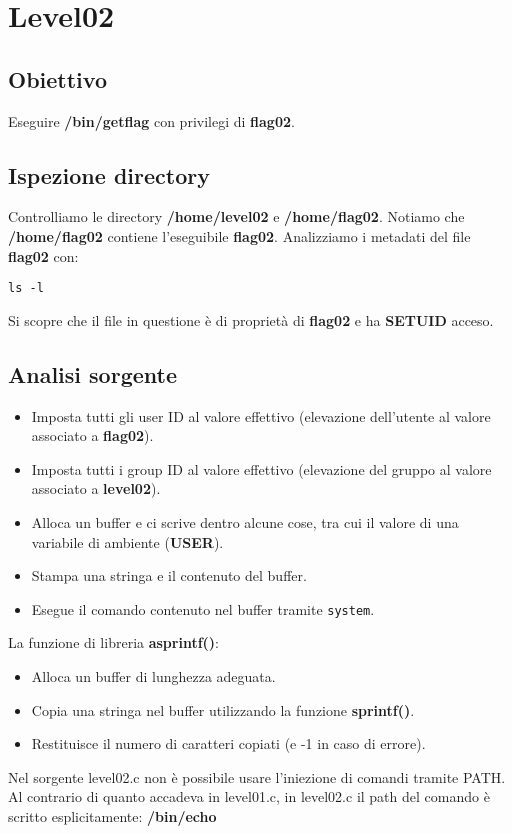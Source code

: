 \section{Level02}
\subsection{Obiettivo}
Eseguire \textbf{/bin/getflag} con privilegi di \textbf{flag02}.
\subsection{Ispezione directory}
Controlliamo le directory \textbf{/home/level02} e \textbf{/home/flag02}. Notiamo che \textbf{/home/flag02} contiene l’eseguibile \textbf{flag02}.
Analizziamo i metadati del file \textbf{flag02} con: 
\begin{lstlisting}[style=bashstyle]
    ls -l
\end{lstlisting}
Si scopre che il file in questione è di proprietà di \textbf{flag02} e ha \textbf{SETUID} acceso.

\subsection{Analisi sorgente}
\begin{itemize}
    \item Imposta tutti gli user ID al valore effettivo (elevazione dell’utente al valore associato a \textbf{flag02}).
    \item Imposta tutti i group ID al valore effettivo (elevazione del gruppo al valore associato a \textbf{level02}).
    \item Alloca un buffer e ci scrive dentro alcune cose, tra cui il valore di una variabile di ambiente (\textbf{USER}).
    \item Stampa una stringa e il contenuto del buffer.
    \item Esegue il comando contenuto nel buffer tramite \texttt{system}.
\end{itemize}
La funzione di libreria \textbf{asprintf()}:
\begin{itemize}
    \item Alloca un buffer di lunghezza adeguata.
    \item Copia una stringa nel buffer utilizzando la funzione \textbf{sprintf()}.
    \item Restituisce il numero di caratteri copiati (e -1 in caso di errore).
\end{itemize}
Nel sorgente level02.c non è possibile usare l’iniezione di comandi tramite PATH. Al contrario di quanto accadeva in level01.c, in level02.c il path del comando è scritto esplicitamente: \textbf{/bin/echo}

